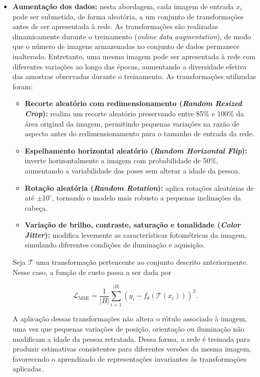\begin{itemize}

\item \textbf{Aumentação dos dados:} nesta abordagem, cada imagem de entrada $x_i$ pode ser submetida, de forma aleatória, a um conjunto de transformações antes de ser apresentada à rede. As transformações são realizadas dinamicamente durante o treinamento (\textit{online data augmentation}), de modo que o número de imagens armazenadas no conjunto de dados permanece inalterado. Entretanto, uma mesma imagem pode ser apresentada à rede com diferentes variações ao longo das épocas, aumentando a diversidade efetiva das amostras observadas durante o treinamento. As transformações utilizadas foram:

\begin{itemize}
    \item \textbf{Recorte aleatório com redimensionamento (\textit{Random Resized Crop}):} realiza um recorte aleatório preservando entre 85\% e 100\% da área original da imagem, permitindo pequenas variações na razão de aspecto antes do redimensionamento para o tamanho de entrada da rede.
    
    \item \textbf{Espelhamento horizontal aleatório (\textit{Random Horizontal Flip}):} inverte horizontalmente a imagem com probabilidade de 50\%, aumentando a variabilidade das poses sem alterar a idade da pessoa.

    \item \textbf{Rotação aleatória (\textit{Random Rotation}):} aplica rotações aleatórias de até $\pm10^\circ$, tornando o modelo mais robusto a pequenas inclinações da cabeça.

    \item \textbf{Variação de brilho, contraste, saturação e tonalidade (\textit{Color Jitter}):} modifica levemente as características fotométricas da imagem, simulando diferentes condições de iluminação e aquisição.
\end{itemize}

Seja $\mathcal{T}$ uma transformação pertencente ao conjunto descrito anteriormente. Nesse caso, a função de custo passa a ser dada por

\begin{equation}
\mathcal{L}_{\mathrm{MSE}}
=
\frac{1}{|B|}
\sum_{i=1}^{|B|}
\left(
y_i-f_{\theta}(\mathcal{T}(x_i))
\right)^2.
\end{equation}

A aplicação dessas transformações não altera o rótulo associado à imagem, uma vez que pequenas variações de posição, orientação ou iluminação não modificam a idade da pessoa retratada. Dessa forma, a rede é treinada para produzir estimativas consistentes para diferentes versões da mesma imagem, favorecendo o aprendizado de representações invariantes às transformações aplicadas.


\end{itemize}
